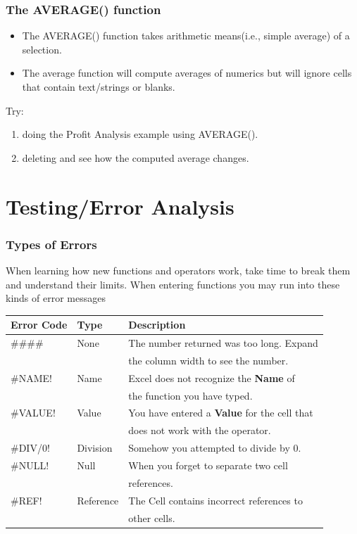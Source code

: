 \documentclass[12pt]{beamer}
\begin{document}
	\begin{frame}
		\frametitle{The AVERAGE() function}
		\begin{itemize}
			\item The AVERAGE() function takes arithmetic means(i.e., simple average) of a selection.
			\item The average function will compute averages of numerics but will ignore cells that contain text/strings or blanks.
		\end{itemize}
	\bigskip
	Try:
	\begin{enumerate} 
		\item doing the Profit Analysis example using AVERAGE(). 
		\item deleting and see how the computed average changes.  
	\end{enumerate}
	\end{frame}
\section{Testing/Error Analysis}
	\begin{frame}
		\frametitle{Types of Errors}
		When learning how new functions and operators work, take time to break them and understand their limits. 
		When entering functions you may run into these kinds of error messages
		\begin{tabular}{ l | l | l }
			Error Code &  Type &Description \\
			\hline
			\#\#\#\#\ & None & The number returned was too long. Expand \\
			&& the column width to see the number. \\
			\#NAME! & Name & Excel does not recognize the \textbf{Name} of\\
			 && the function you have typed.\\
			\#VALUE! & Value & You have entered a \textbf{Value} for the cell that \\
			&& does not work with the operator. \\
			\#DIV/0! & Division & Somehow you attempted to divide by 0. \\
			\#NULL! & Null & When you forget to separate two cell\\
			&& references. \\
			\#REF! & Reference & The Cell contains incorrect references to\\
			&& other cells. \\
		\end{tabular}
	\end{frame}
	
\end{document}
